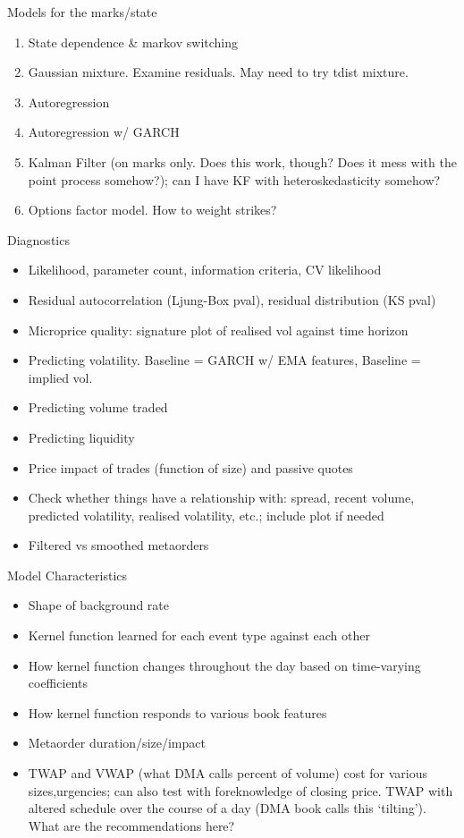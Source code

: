 \documentclass[honours,12pt]{unswthesis}
\numberwithin{equation}{section}
\begin{document}
Models for the marks/state
\begin{enumerate}
	\item State dependence \& markov switching
	\item Gaussian mixture. Examine residuals. May need to try tdist mixture.
	\item Autoregression
	\item Autoregression w/ GARCH
	\item Kalman Filter (on marks only. Does this work, though? Does it mess with the point process somehow?); can I have KF with heteroskedasticity somehow?
	\item Options factor model. How to weight strikes?
\end{enumerate}

Diagnostics
\begin{itemize}
	\item Likelihood, parameter count, information criteria, CV likelihood
	\item Residual autocorrelation (Ljung-Box pval), residual distribution (KS pval)
	\item Microprice quality: signature plot of realised vol against time horizon
	\item Predicting volatility. Baseline = GARCH w/ EMA features, Baseline = implied vol.
	\item Predicting volume traded
	\item Predicting liquidity
	\item Price impact of trades (function of size) and passive quotes
	\item Check whether things have a relationship with: spread, recent volume, predicted volatility, realised volatility, etc.; include plot if needed
	\item Filtered vs smoothed metaorders
\end{itemize}

Model Characteristics
\begin{itemize}
	\item Shape of background rate
	\item Kernel function learned for each event type against each other
	\item How kernel function changes throughout the day based on time-varying coefficients
	\item How kernel function responds to various book features
	\item Metaorder duration/size/impact
	\item TWAP and VWAP (what DMA calls percent of volume) cost for various sizes,urgencies; can also test with foreknowledge of closing price. TWAP with altered schedule over the course of a day (DMA book calls this `tilting'). What are the recommendations here?
\end{itemize}
\end{document}
